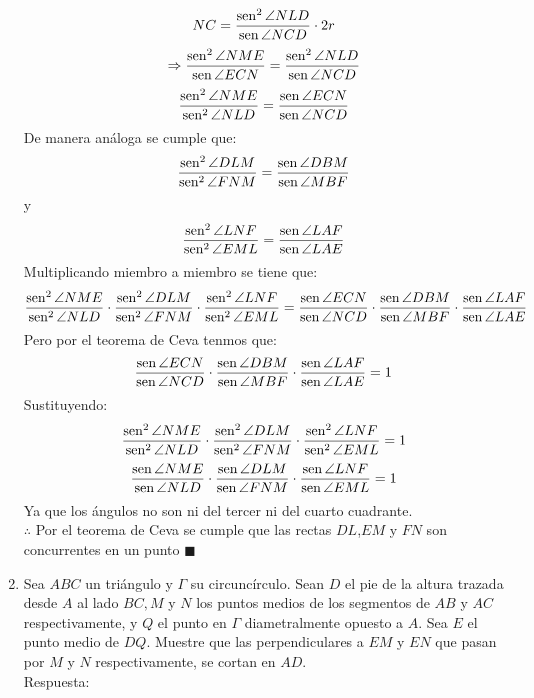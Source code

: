 \documentclass{book}
\newcommand{\sen}{\mathop{\rm sen}\nolimits} %
\begin{document}
\begin{enumerate}
        $$NC={\sen^2  {\angle NLD}\over\sen {\angle NCD}}\cdot 2r$$
        $$\Rightarrow{\sen^2  {\angle NME}\over\sen {\angle ECN}}={\sen^2  {\angle NLD}\over\sen {\angle NCD}}$$
        $${\sen^2  {\angle NME}\over\sen^2  {\angle NLD}}={\sen {\angle ECN}\over\sen {\angle NCD}}$$
        De manera análoga se cumple que:
        $${\sen^2  {\angle DLM}\over\sen^2  {\angle FNM}}={\sen {\angle DBM}\over\sen {\angle MBF}}$$
        y
        $${\sen^2  {\angle LNF}\over\sen^2  {\angle EML}}={\sen {\angle LAF}\over\sen {\angle LAE}}$$
        Multiplicando miembro a miembro se tiene que:
        $${\sen^2  {\angle NME}\over\sen^2  {\angle NLD}}\cdot{\sen^2  {\angle DLM}\over\sen^2  {\angle FNM}}\cdot{\sen^2  {\angle LNF}\over\sen^2  {\angle EML}}={\sen {\angle ECN}\over\sen {\angle NCD}}\cdot{\sen {\angle DBM}\over\sen {\angle MBF}}\cdot{\sen {\angle LAF}\over\sen {\angle LAE}}$$
        Pero por el teorema de Ceva tenmos que:
        $${\sen {\angle ECN}\over\sen {\angle NCD}}\cdot{\sen {\angle DBM}\over\sen {\angle MBF}}\cdot{\sen {\angle LAF}\over\sen {\angle LAE}}=1$$
        Sustituyendo:
        $${\sen^2  {\angle NME}\over\sen^2  {\angle NLD}}\cdot{\sen^2  {\angle DLM}\over\sen^2  {\angle FNM}}\cdot{\sen^2  {\angle LNF}\over\sen^2  {\angle EML}}=1$$
        $${\sen  {\angle NME}\over\sen  {\angle NLD}}\cdot{\sen  {\angle DLM}\over\sen  {\angle FNM}}\cdot{\sen  {\angle LNF}\over\sen  {\angle EML}}=1$$
        Ya que los ángulos no son ni del tercer ni del cuarto cuadrante.\\
        $\therefore$ Por el teorema de Ceva se cumple que las rectas $DL$,$EM$ y $FN$ son concurrentes en un punto $\blacksquare$\\
        \item Sea $ABC$ un triángulo y $\Gamma$ su circuncírculo. Sean $D$ el pie de la altura trazada desde $A$ al lado $BC, M$ y $N$ los puntos medios de los segmentos de $AB$ y $AC$ respectivamente, y $Q$ el punto en $\Gamma$ diametralmente opuesto a $A$. Sea $E$ el punto medio de $DQ$. Muestre que las perpendiculares a $EM$ y $EN$ que pasan por $M$ y $N$ respectivamente, se cortan en $AD$.  \\
        Respuesta:
        \begin{center}

\end{center}
\end{enumerate}
\end{document}
